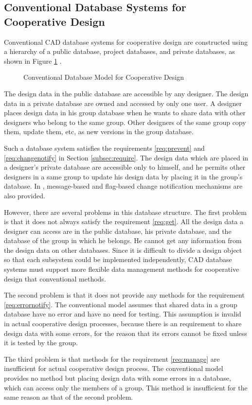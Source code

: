 \subsection{Conventional Database Systems for Cooperative Design}
Conventional CAD database systems for cooperative design are 
constructed using a hierarchy of a public database, project databases, 
and private databases, as shown in Figure \ref{fig:groupdb}
\cite{Chou:vldb86,Klahold:sigmod85}.
\label{subsec:conventionaldb}
\begin{figure}
\begin{center}

\end{center}
\caption{Conventional Database Model for Cooperative Design}
\label{fig:groupdb}
\end{figure}

The design data in the public database are accessible by any designer.
The design data in a private database are owned and accessed by only one
user.
A designer places design data in his group database when he wants to
share data with other designers who belong to the same group.
Other designers of the same group copy them, update them, etc, as new
versions in the group database.

Such a database system satisfies the requirements \ref{req:prevent} and
\ref{req:changenotify} in Section \ref{subsec:require}.
The design data which are placed in a designer's private database are
accessible only to himself, and he permits other designers in a same group
to update his design data by placing it in the group's database.
In \cite{Chou:vldb86}, message-based and flag-based change
notification mechanisms are also provided.

However, there are several problems in this database structure.
The first problem is that it does not always satisfy the requirement 
\ref{req:get}.
All the design data a designer can access are in the public database, his
private database, and the database of the group in which he belongs.
He cannot get any information from the design data on other databases.
Since it is difficult to divide a design object so that each subsystem
could be implemented independently, CAD database systems must support
more flexible data management methods for cooperative design that
conventional methods.

The second problem is that it does not provide any methods for the
requirement \ref{req:errornotify}.
The conventional model assumes that shared data in a group database have
no error and have no need for testing.
This assumption is invalid in actual cooperative design processes,
because there is an requirement to share design data with some errors,
for the reason that its errors cannot be fixed unless it is tested by
the group.

The third problem is that methods for the requirement
\ref{req:manage} are insufficient for actual cooperative design process.
The conventional model provides no method but placing design data with
some errors in a database, which can access only the members of a group.
This method is insufficient for the same reason as that of the second problem.

